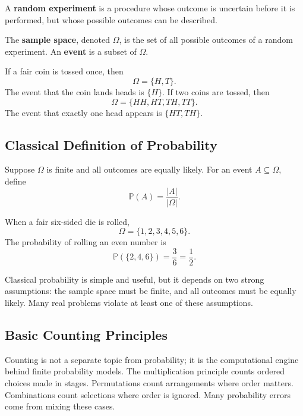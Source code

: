 \begin{definition}
A \textbf{random experiment} is a procedure whose outcome is uncertain before it is performed, but whose possible outcomes can be described.
\end{definition}

\begin{definition}
The \textbf{sample space}, denoted $\Omega$, is the set of all possible outcomes of a random experiment. An \textbf{event} is a subset of $\Omega$.
\end{definition}

\newpage

\begin{example}
If a fair coin is tossed once, then
\[
    \Omega=\{H,T\}.
\]
The event that the coin lands heads is $\{H\}$. If two coins are tossed, then
\[
    \Omega=\{HH,HT,TH,TT\}.
\]
The event that exactly one head appears is $\{HT,TH\}$.
\end{example}

\subsection{Classical Definition of Probability}

\begin{definition}
Suppose $\Omega$ is finite and all outcomes are equally likely. For an event $A\subseteq\Omega$, define
\[
    \mathbb{P}(A)=\frac{|A|}{|\Omega|}.
\]
\end{definition}

\begin{example}
When a fair six-sided die is rolled,
\[
    \Omega=\{1,2,3,4,5,6\}.
\]
The probability of rolling an even number is
\[
    \mathbb{P}(\{2,4,6\})=\frac{3}{6}=\frac12.
\]
\end{example}

Classical probability is simple and useful, but it depends on two strong assumptions: the sample space must be finite, and all outcomes must be equally likely. Many real problems violate at least one of these assumptions.

\subsection{Basic Counting Principles}


Counting is not a separate topic from probability; it is the computational engine behind finite probability models. The multiplication principle counts ordered choices made in stages. Permutations count arrangements where order matters. Combinations count selections where order is ignored. Many probability errors come from mixing these cases.

